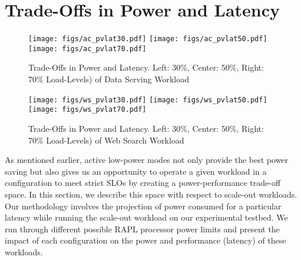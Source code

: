 \documentclass{sig-alternate}
\begin{document}
 \section{Trade-Offs in Power and Latency}
\label{sec:pvlat}

\begin{figure*}[t]
\centering
\texttt{[image: figs/ac\_pvlat30.pdf]}
\texttt{[image: figs/ac\_pvlat50.pdf]}
\texttt{[image: figs/ac\_pvlat70.pdf]}
\caption{Trade-Offs in Power and Latency. Left: 30\%, Center: 50\%, 
Right: 70\% Load-Levels) of Data Serving Workload}
\label{fig:acpvlat}
\centering
\texttt{[image: figs/ws\_pvlat30.pdf]}
\texttt{[image: figs/ws\_pvlat50.pdf]}
\texttt{[image: figs/ws\_pvlat70.pdf]}
\caption{Trade-Offs in Power and Latency. Left: 30\%, Center: 50\%, 
Right: 70\% Load-Levels) of Web Search Workload}
\label{fig:wspvlat}
\end{figure*}

As mentioned earlier, active low-power modes not only provide the 
best power saving but also gives us an opportunity to operate a given 
workload in a configuration to meet strict SLOs by creating a 
power-performance trade-off space. In this section, we describe this 
space with respect to scale-out workloads. Our methodology involves the 
projection of power consumed for a particular latency while running 
the scale-out workload on our experimental testbed. We run through 
different possible RAPL processor power limits and present the impact 
of each configuration on the power and performance (latency) of these workloads.
\end{document}
